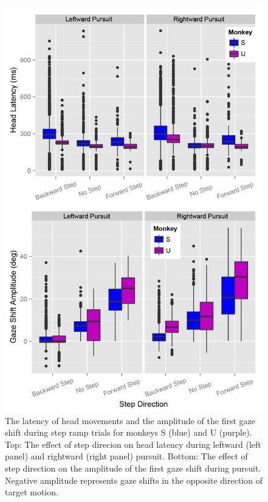 \documentclass[12pt]{article}
\begin{document}
\begin{figure}
\centering
\includegraphics[width=0.7\linewidth]{./figs/StepRampLatencyandGSAmp}
\caption[Head Latency and Gaze Shift Amplitude during Step Ramp Trials]{The latency of head movements and the amplitude of the first gaze shift during step ramp trials for monkeys S (blue) and U (purple). Top: The effect of step direcion on head latency during leftward (left panel) and rightward (right panel) pursuit. Bottom: The effect of step direction on the amplitude of the first gaze shift during pursuit. Negative amplitude represents gaze shifts in the opposite direction of target motion.}
\label{fig:StepRampLatencyandGSAmp}
\end{figure}
\end{document}
